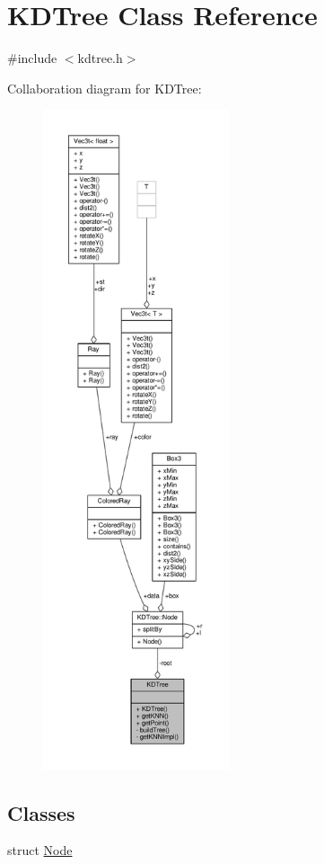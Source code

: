 \hypertarget{classKDTree}{}\section{K\+D\+Tree Class Reference}
\label{classKDTree}


{\ttfamily \#include $<$kdtree.\+h$>$}



Collaboration diagram for K\+D\+Tree\+:\nopagebreak
\begin{figure}[H]
\begin{center}
\leavevmode
\includegraphics[height=550pt]{classKDTree__coll__graph}
\end{center}
\end{figure}
\subsection*{Classes}
\begin{DoxyCompactItemize}
\item 
struct \hyperlink{structKDTree_1_1Node}{Node}
\end{DoxyCompactItemize}
